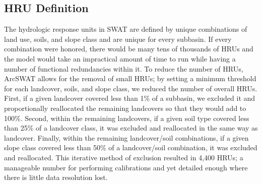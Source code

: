 \subsection{HRU Definition}\label{sec:hru_definition}

The hydrologic response units in SWAT are defined by unique combinations of land use, soils, and slope class and are unique for every subbasin. 
If every combination were honored, there would be many tens of thousands of HRUs and the model would take an impractical amount of time to run while having a number of functional redundancies within it. 
To reduce the number of HRUs, ArcSWAT allows for the removal of small HRUs; by setting a minimum threshold for each landcover, soils, and slope class, we reduced the number of overall HRUs. 
First, if a given landcover covered less than 1\% of a subbasin, we excluded it and proportionally reallocated the remaining landcovers so that they would add to 100\%. 
Second, within the remaining landcovers, if a given soil type covered less than 25\% of a landcover class, it was excluded and reallocated in the same way as landcover. 
Finally, within the remaining landcover/soil combinations, if a given slope class covered less than 50\% of a landcover/soil combination, it was excluded and reallocated. 
This iterative method of exclusion resulted in 4,400 HRUs; a manageable number for performing calibrations and yet detailed enough where there is little data resolution lost. %